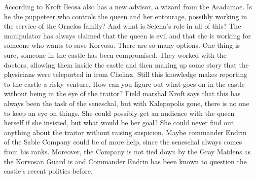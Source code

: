 According to Kroft Ileosa also has a new advisor, a wizard from the Acadamae. Is he the puppeteer who controls the queen and her entourage, possibly working in the service of the Ornelos family? And what is Selena's role in all of this? The manipulator has always claimed that the queen is evil and that she is working for someone who wants to save Korvosa. There are so many options. One thing is sure, someone in the castle has been compromised. They worked with the doctors, allowing them inside the castle and then making up some story that the physicians were teleported in from Cheliax. Still this knowledge makes reporting to the castle a risky venture. How can you figure out what goes on in the castle without being in the eye of the traitor? Field marshal Kroft says that this has always been the task of the seneschal, but with Kalepopolis gone, there is no one to keep an eye on things. She could possibly get an audience with the queen herself if she insisted, but what would be her goal? She could never find out anything about the traitor without raising suspicion. Maybe commander Endrin of the Sable Company could be of more help, since the seneschal always comes from his ranks. Moreover, the Company is not tied down by the Gray Maidens as the Korvosan Guard is and Commander Endrin has been known to question the castle's recent politics before.\\

